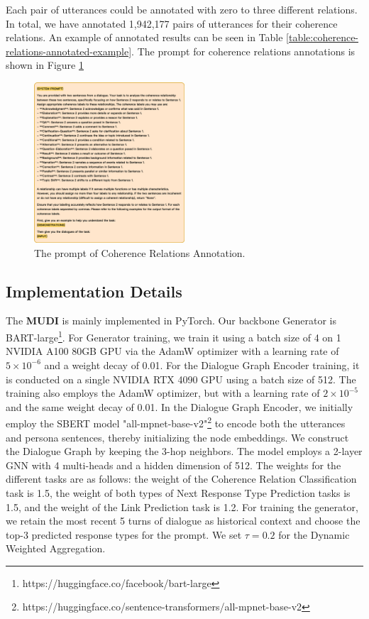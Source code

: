 \documentclass[letterpaper]{article} %
\begin{document}
Each pair of utterances could be annotated with zero to three different relations. In total, we have annotated 1,942,177 pairs of utterances for their coherence relations. An example of annotated results can be seen in Table \ref{table:coherence-relations-annotated-example}. The prompt for coherence relations annotations is shown in Figure \ref{fig:coherence_reltaions_annotated_prompt}

\begin{figure}[ht]
    \centering
    \includegraphics[width=0.5\textwidth]{./images/coherence_reltaions_annotated_prompt.png}
    \caption{The prompt of Coherence Relations Annotation.}
    \label{fig:coherence_reltaions_annotated_prompt}
\end{figure}

\subsection{Implementation Details}
The \textbf{MUDI} is mainly implemented in PyTorch. Our backbone Generator is BART-large\footnote[2]{https://huggingface.co/facebook/bart-large}. For Generator training, we train it using a batch size of 4 on 1 NVIDIA A100 80GB
GPU via the AdamW optimizer with a learning rate of \(5 \times 10^{-6}\) and a
weight decay of 0.01. For the Dialogue Graph Encoder training, it is conducted on a single NVIDIA RTX 4090 GPU using a batch size of 512. The training also employs the AdamW optimizer, but with a learning rate of \(2 \times 10^{-5}\) and the same weight decay of 0.01. In the Dialogue Graph Encoder, we initially employ the SBERT model "all-mpnet-base-v2"\footnote[3]{https://huggingface.co/sentence-transformers/all-mpnet-base-v2} to encode both the utterances and persona sentences, thereby initializing the node embeddings. We construct the Dialogue Graph by keeping the 3-hop neighbors. The model employs a 2-layer GNN with 4 multi-heads and a hidden dimension of 512. The weights for the different tasks are as follows: the weight of the Coherence Relation Classification task is 1.5, the weight of both types of Next Response Type Prediction tasks is 1.5, and the weight of the Link Prediction task is 1.2. For training the generator, we retain the most recent 5 turns of dialogue as historical context and choose the top-3 predicted response types for the prompt. We set \(\tau = 0.2\) for the Dynamic Weighted Aggregation.
\end{document}
